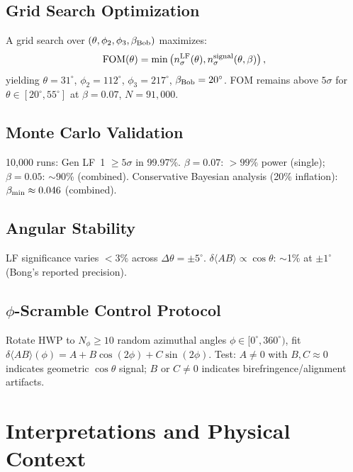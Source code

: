 \documentclass[12pt]{article}
\begin{document}
\subsection{Grid Search Optimization}

A grid search over $(\theta, \phi_2, \phi_3, \beta_{\rm Bob})$ maximizes:
\begin{equation}
\text{FOM}(\theta) = \min\left( n_\sigma^{\rm LF}(\theta), n_\sigma^{\rm signal}(\theta, \beta) \right),
\end{equation}
yielding $\theta = 31^\circ$, $\phi_2 = 112^\circ$, $\phi_3 = 217^\circ$, $\beta_{\rm Bob} = 20^\circ$. FOM remains above $5\sigma$ for $\theta \in [20^\circ, 55^\circ]$ at $\beta = 0.07$, $N = 91{,}000$.

\subsection{Monte Carlo Validation}

10{,}000 runs: Gen LF~1 $\ge 5\sigma$ in 99.97\%. $\beta = 0.07$: ${>}99\%$ power (single); $\beta = 0.05$: $\sim$90\% (combined). Conservative Bayesian analysis (20\% inflation): $\beta_{\rm min} \approx 0.046$ (combined).

\subsection{Angular Stability}

LF significance varies ${<}3\%$ across $\Delta\theta = \pm 5^\circ$. $\delta\langle AB\rangle \propto \cos\theta$: $\sim$1\% at $\pm 1^\circ$ (Bong's reported precision).

\subsection{$\phi$-Scramble Control Protocol}

Rotate HWP to $N_\phi \geq 10$ random azimuthal angles $\phi \in [0^\circ, 360^\circ)$, fit $\delta\langle AB\rangle(\phi) = A + B\cos(2\phi) + C\sin(2\phi)$. Test: $A \neq 0$ with $B, C \approx 0$ indicates geometric $\cos\theta$ signal; $B$ or $C \neq 0$ indicates birefringence/alignment artifacts.

\section{Interpretations and Physical Context}
\label{sec:S3}
\end{document}
